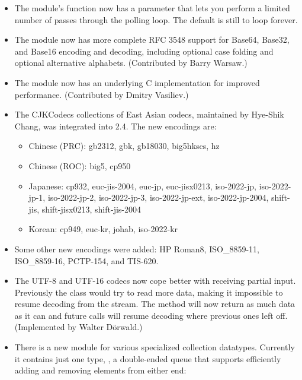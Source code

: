 \documentclass{howto}
\begin{document}
\begin{itemize}

\item The  module's  function now
   has a  parameter that lets you perform a limited number
   of passes through the polling loop.  The default is still to loop
   forever.

\item The  module now has more complete RFC 3548 support
  for Base64, Base32, and Base16 encoding and decoding, including
  optional case folding and optional alternative alphabets.
  (Contributed by Barry Warsaw.)

\item The  module now has an underlying C implementation
   for improved performance.
   (Contributed by Dmitry Vasiliev.)

\item The CJKCodecs collections of East Asian codecs, maintained
by Hye-Shik Chang, was integrated into 2.4.  
The new encodings are:

\begin{itemize}
 \item Chinese (PRC): gb2312, gbk, gb18030, big5hkscs, hz
 \item Chinese (ROC): big5, cp950
 \item Japanese: cp932, euc-jis-2004, euc-jp,
euc-jisx0213, iso-2022-jp, iso-2022-jp-1, iso-2022-jp-2,
 iso-2022-jp-3, iso-2022-jp-ext, iso-2022-jp-2004,
 shift-jis, shift-jisx0213, shift-jis-2004
 \item Korean: cp949, euc-kr, johab, iso-2022-kr
\end{itemize} 

\item Some other new encodings were added: HP Roman8, 
ISO_8859-11, ISO_8859-16, PCTP-154, and TIS-620.

\item The UTF-8 and UTF-16 codecs now cope better with receiving partial input.
Previously the  class would try to read more data,
making it impossible to resume decoding from the stream.  The
 method will now return as much data as it can and future
calls will resume decoding where previous ones left off. 
(Implemented by Walter D\"orwald.)

\item There is a new  module for 
   various specialized collection datatypes.  
   Currently it contains just one type, , 
   a double-ended queue that supports efficiently adding and removing
   elements from either end:


\end{itemize}
\end{document}
